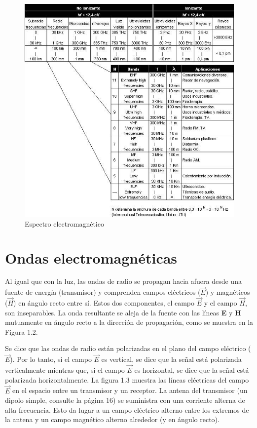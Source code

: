 \begin{figure}[!htb]
  \centering
  \includegraphics[width=\textwidth]{Apendices/Apendice.A.imagenes/espectro-frecuencias.jpg}
  \caption{Espectro electromagn\'etico}
  \label{fig:A.espectro.electromagnetico}
\end{figure}


\section{Ondas electromagnéticas}
\label{sec:A.03.ondas.electromagneticas}


Al igual que con la luz, las ondas de radio se propagan hacia afuera desde una fuente de energía (transmisor) y comprenden campos eléctricos ($\vec{E}$) y magnéticos ($\vec{H}$) en ángulo recto entre sí. Estos dos componentes, el campo $\vec{E}$ y el campo $\vec{H}$, son inseparables. La onda resultante se aleja de la fuente con las líneas \textbf{E} y \textbf{H} mutuamente en ángulo recto a la dirección de propagación, como se muestra en la Figura 1.2.

Se dice que las ondas de radio están polarizadas en el plano del campo eléctrico ($\vec{E}$). Por lo tanto, si el campo $\vec{E}$ es vertical, se dice que la señal está polarizada verticalmente mientras que, si el campo $\vec{E}$ es horizontal, se dice que la señal está polarizada horizontalmente. La figura 1.3 muestra las líneas eléctricas del campo  $\vec{E}$ en el espacio entre un transmisor y un receptor. La antena del transmisor (un dipolo simple, consulte la página 16) se suministra con una corriente alterna de alta frecuencia. Esto da lugar a un campo eléctrico alterno entre los extremos de la antena y un campo magnético alterno alrededor (y en ángulo recto).

